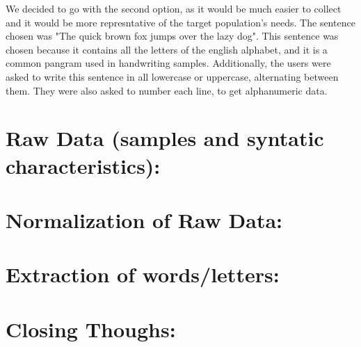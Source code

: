 \documentclass[twoside,a4paper]{article}
\begin{document}
We decided to go with the second option, as it would be much easier to collect and it would be more represntative of the target population's needs.
The sentence chosen was "The quick brown fox jumps over the lazy dog". This sentence was chosen because it contains all the letters of the english alphabet, and it is a common pangram used in handwriting samples.
Additionally, the users were asked to write this sentence in all lowercase or uppercase, alternating between them. They were also asked to number each line, to get alphanumeric data.


\section{Raw Data (samples and syntatic characteristics): }


\section{Normalization of Raw Data: }
\section{Extraction of words/letters: }
\section{Closing Thoughs: }
\printbibliography
\end{document}
